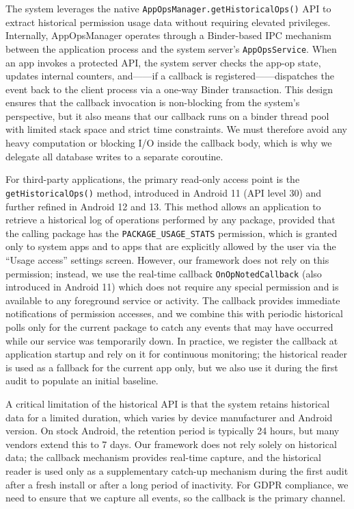 The system leverages the native \texttt{AppOpsManager.getHistoricalOps()} API to extract historical permission usage data without requiring elevated privileges. Internally, AppOpsManager operates through a Binder-based IPC mechanism between the application process and the system server's \texttt{AppOpsService}. When an app invokes a protected API, the system server checks the app-op state, updates internal counters, and——if a callback is registered——dispatches the event back to the client process via a one-way Binder transaction. This design ensures that the callback invocation is non-blocking from the system's perspective, but it also means that our callback runs on a binder thread pool with limited stack space and strict time constraints. We must therefore avoid any heavy computation or blocking I/O inside the callback body, which is why we delegate all database writes to a separate coroutine.

For third-party applications, the primary read-only access point is the \texttt{getHistoricalOps()} method, introduced in Android 11 (API level 30) and further refined in Android 12 and 13. This method allows an application to retrieve a historical log of operations performed by any package, provided that the calling package has the \texttt{PACKAGE\_USAGE\_STATS} permission, which is granted only to system apps and to apps that are explicitly allowed by the user via the ``Usage access'' settings screen. However, our framework does not rely on this permission; instead, we use the real-time callback \texttt{OnOpNotedCallback} (also introduced in Android 11) which does not require any special permission and is available to any foreground service or activity. The callback provides immediate notifications of permission accesses, and we combine this with periodic historical polls only for the current package to catch any events that may have occurred while our service was temporarily down. In practice, we register the callback at application startup and rely on it for continuous monitoring; the historical reader is used as a fallback for the current app only, but we also use it during the first audit to populate an initial baseline.

A critical limitation of the historical API is that the system retains historical data for a limited duration, which varies by device manufacturer and Android version. On stock Android, the retention period is typically 24 hours, but many vendors extend this to 7 days. Our framework does not rely solely on historical data; the callback mechanism provides real-time capture, and the historical reader is used only as a supplementary catch-up mechanism during the first audit after a fresh install or after a long period of inactivity. For GDPR compliance, we need to ensure that we capture all events, so the callback is the primary channel.

